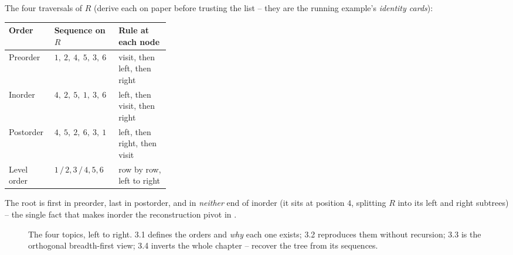 \medskip
\noindent The four traversals of $R$ (derive each on paper before trusting the list --
they are the running example's \emph{identity cards}):
\begin{center}
\renewcommand{\arraystretch}{1.25}
\begin{tabular}{@{}l l p{0.32\linewidth}@{}}
\toprule
\textbf{Order} & \textbf{Sequence on $R$} & \textbf{Rule at each node} \\
\midrule
Preorder   & $1,\ 2,\ 4,\ 5,\ 3,\ 6$ & visit, then left, then right \\
Inorder    & $4,\ 2,\ 5,\ 1,\ 3,\ 6$ & left, then visit, then right \\
Postorder  & $4,\ 5,\ 2,\ 6,\ 3,\ 1$ & left, then right, then visit \\
Level order& $1\,/\,2,3\,/\,4,5,6$   & row by row, left to right \\
\bottomrule
\end{tabular}
\end{center}
The root is first in preorder, last in postorder, and in \emph{neither} end of inorder
(it sits at position $4$, splitting $R$ into its left and right subtrees) -- the single
fact that makes inorder the reconstruction pivot in .

\begin{figure}[H]
\centering
{}
\caption*{The four topics, left to right. 3.1 defines the orders and \emph{why} each
one exists; 3.2 reproduces them without recursion; 3.3 is the orthogonal
breadth-first view; 3.4 inverts the whole chapter -- recover the tree from its
sequences.}
\end{figure}

